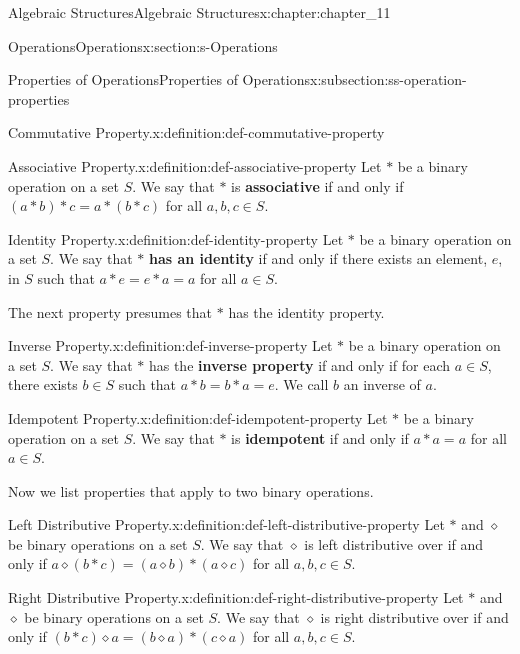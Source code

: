 \documentclass[oneside,10pt,]{book}
\newcommand{\terminology}[1]{\textbf{#1}}
\numberwithin{equation}{section}
\begin{document}
\begin{chapterptx}{Algebraic Structures}{}{Algebraic Structures}{}{}{x:chapter:chapter_11}
\begin{sectionptx}{Operations}{}{Operations}{}{}{x:section:s-Operations}
\begin{subsectionptx}{Properties of Operations}{}{Properties of Operations}{}{}{x:subsection:ss-operation-properties}
\begin{definition}{Commutative Property.}{x:definition:def-commutative-property}
\end{definition}
\begin{definition}{Associative Property.}{x:definition:def-associative-property}%
%
Let \(*\) be a binary operation on a set \(S\). We say that \(*\) is  \terminology{associative}  if and only if \((a * b) * c = a * (b * c)\) for all \(a, b, c \in  S\).%
\end{definition}
\begin{definition}{Identity Property.}{x:definition:def-identity-property}%
%
Let \(*\) be a binary operation on a set \(S\). We say that \(*\)   \terminology{has an identity} if and only if there exists an element, \(e\), in \(S\) such that \(a * e = e * a = a\) for all \(a \in S\).%
\end{definition}
The next property presumes that \(*\) has the identity property.%
\begin{definition}{Inverse Property.}{x:definition:def-inverse-property}%
%
Let \(*\) be a binary operation on a set \(S\). We say that \(*\)  has the  \terminology{inverse property}  if and only if for each \(a \in  S\), there exists  \(b \in  S\) such that \(a*b = b*a = e\).   We call \(b\) an inverse of \(a\).%
\end{definition}
\begin{definition}{Idempotent Property.}{x:definition:def-idempotent-property}%
%
Let \(*\) be a binary operation on a set \(S\). We say that \(*\)  is  \terminology{idempotent}  if and only if \(a * a = a\) for all \(a \in S\).%
\end{definition}
Now we list properties that apply to two binary operations.%
\begin{definition}{Left Distributive Property.}{x:definition:def-left-distributive-property}%
%
Let \(*\) and \(\diamond\) be  binary operations on a set \(S\). We say that \(\diamond\)  is left distributive over \textasteriskcentered{} if and only if \(a \diamond  (b * c) = (a \diamond  b) * (a \diamond  c)\) for all \(a,b,c\in S\).%
\end{definition}
\begin{definition}{Right Distributive Property.}{x:definition:def-right-distributive-property}%
%
Let \(*\) and \(\diamond\) be  binary operations on a set \(S\). We say that \(\diamond\)  is right distributive over \textasteriskcentered{} if and only if \((b * c)\diamond a = (b\diamond a) * (c \diamond  a)\) for all \(a,b,c\in S\).%

\end{definition}
\end{subsectionptx}
\end{sectionptx}
\end{chapterptx}
\end{document}
